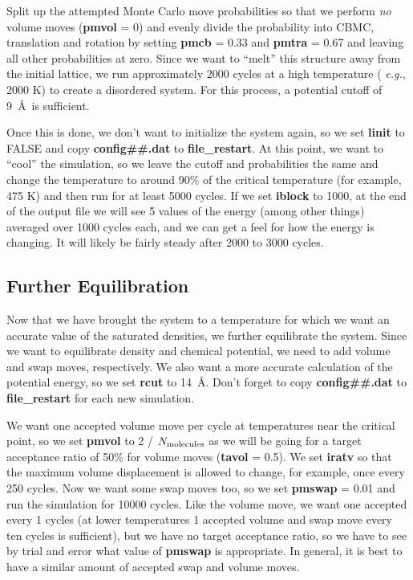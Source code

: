 \documentclass[12pt,letterpaper]{article}
\begin{document}
Split up the attempted Monte Carlo move probabilities so
that we perform {\sl no} volume moves ({\bf pmvol} = 0) and
evenly divide the probability into CBMC, translation and
rotation by setting {\bf pmcb} = 0.33 and {\bf pmtra} = 0.67
and leaving all other probabilities at zero. Since we want
to ``melt'' this structure away from the initial lattice, we
run approximately 2000 cycles at a high temperature ({\it
  e.g.}, 2000 K) to create a disordered system. For this
process, a potential cutoff of 9~\AA~is sufficient.

\noindent Once this is done, we don't want to initialize the
system again, so we set {\bf linit} to FALSE and copy {\bf
  config\#\#.dat} to {\bf file\_restart}. At this point, we
want to ``cool'' the simulation, so we leave the cutoff and
probabilities the same and change the temperature to around
90\% of the critical temperature (for example, 475 K) and
then run for at least 5000 cycles. If we set {\bf iblock} to
1000, at the end of the output file we will see 5 values of
the energy (among other things) averaged over 1000 cycles
each, and we can get a feel for how the energy is changing.
It will likely be fairly steady after 2000 to 3000 cycles.

\subsection{Further Equilibration}
Now that we have brought the system to a temperature for
which we want an accurate value of the saturated densities,
we further equilibrate the system. Since we want to
equilibrate density and chemical potential, we need to add
volume and swap moves, respectively. We also want a more
accurate calculation of the potential energy, so we set {\bf
  rcut} to 14~\AA. Don't forget to copy {\bf config\#\#.dat}
to {\bf file\_restart} for each new simulation.

We want one accepted volume move per cycle at temperatures near 
the critical point, so we set {\bf pmvol} to 2 / $N_{\rm molecules}$ 
as we will be going for a target acceptance ratio of 50\% for 
volume moves ({\bf tavol} = 0.5). We set {\bf iratv} so that the maximum
volume displacement is allowed to change, for example, once
every 250 cycles. Now we want some swap moves too, so we set
{\bf pmswap} = 0.01 and run the simulation for 10000 cycles.
Like the volume move, we want one accepted every 1 cycles (at 
lower temperatures 1 accepted volume and swap move every ten cycles 
is sufficient), but we have no target acceptance ratio, so we 
have to see by trial and error what value of {\bf pmswap} is appropriate.
In general, it is best to have a similar amount of accepted swap and
volume moves.
\end{document}
